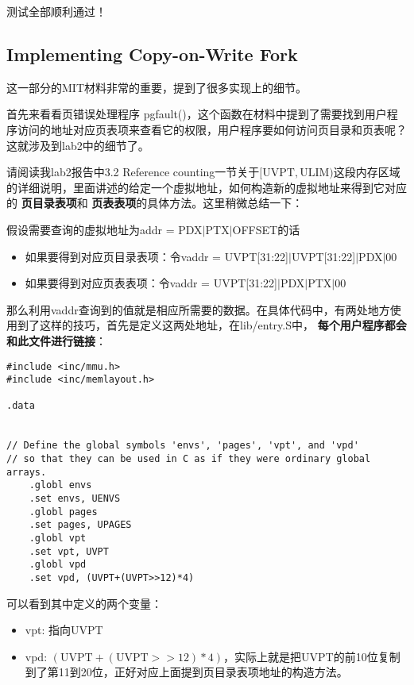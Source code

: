 \documentclass{article}
\newcommand{\highlight}[1]{{\bfseries \color{red}  #1}}
\newcommand{\funcname}[1]{{\ttfamily \small #1}}
\begin{document}
\begin{CJK*}{UTF8}{gkai}
测试全部顺利通过！

\subsection{Implementing Copy-on-Write Fork}

这一部分的MIT材料非常的重要，提到了很多实现上的细节。

首先来看看页错误处理程序 \funcname{pgfault()}，这个函数在材料中提到了需要找到用户程序访问的地址对应页表项来查看它的权限，用户程序要如何访问页目录和页表呢？这就涉及到lab2中的细节了。

请阅读我lab2报告中3.2 Reference counting一节关于$[\mathrm{UVPT}, \mathrm{ULIM})$这段内存区域的详细说明，里面讲述的给定一个虚拟地址，如何构造新的虚拟地址来得到它对应的\highlight{页目录表项}和\highlight{页表表项}的具体方法。这里稍微总结一下：

假设需要查询的虚拟地址为addr = PDX$\left|\right.$PTX$\left|\right.$OFFSET的话
\begin{itemize}
\item{如果要得到对应页目录表项：令vaddr = UVPT[31:22]$\left|\right.$UVPT[31:22]$\left|\right.$PDX$\left|\right.$00}
\item{如果要得到对应页表表项：令vaddr = UVPT[31:22]$\left|\right.$PDX$\left|\right.$PTX$\left|\right.$00}
\end{itemize}

那么利用vaddr查询到的值就是相应所需要的数据。在具体代码中，有两处地方使用到了这样的技巧，首先是定义这两处地址，在lib/entry.S中，\highlight{每个用户程序都会和此文件进行链接}：

\begin{lstlisting}[style=acode, title={\scriptsize \ttfamily \bfseries lib/entry.S}]
#include <inc/mmu.h>
#include <inc/memlayout.h>

.data


// Define the global symbols 'envs', 'pages', 'vpt', and 'vpd'
// so that they can be used in C as if they were ordinary global arrays.
	.globl envs
	.set envs, UENVS
	.globl pages
	.set pages, UPAGES
	.globl vpt
	.set vpt, UVPT
	.globl vpd
	.set vpd, (UVPT+(UVPT>>12)*4)

\end{lstlisting}

可以看到其中定义的两个变量：

\begin{itemize}
\item{vpt: 指向UVPT}
\item{vpd: $(\mathrm{UVPT}+(\mathrm{UVPT}>>12)*4)$}，实际上就是把UVPT的前10位复制到了第11到20位，正好对应上面提到页目录表项地址的构造方法。
\end{itemize}


\end{CJK*}
\end{document}
